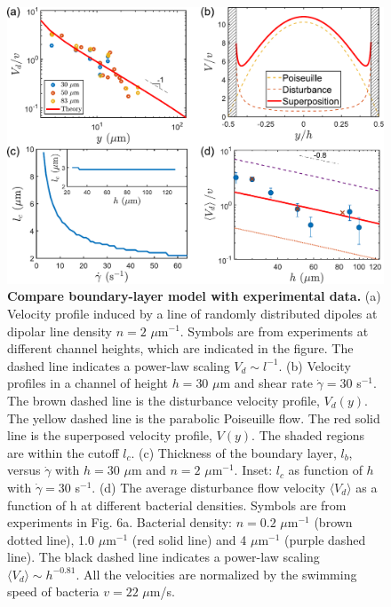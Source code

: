 \begin{figure}[!ht]
	\begin{center}
	\includegraphics[width=5.5 in]{Figs/3-Rheo/7b.pdf}
	\end{center}
	\caption[Compare Boundary-layer Model with Experimental Data]
	{
	\textbf{Compare boundary-layer model with experimental data.}
  (a) Velocity profile induced by a line of randomly distributed dipoles at dipolar line density $n = 2$ $\mu$m$^{-1}$. Symbols are from experiments at different channel heights, which are indicated in the figure. The dashed line indicates a power-law scaling $V_d \sim l^{-1}$.
  (b) Velocity profiles in a channel of height $h = 30$ $\mu$m and shear rate $\dot\gamma=30$ s$^{-1}$. The brown dashed line is the disturbance velocity profile, $V_d(y)$. The yellow dashed line is the parabolic Poiseuille flow. The red solid line is the superposed velocity profile, $V(y)$. The shaded regions are within the cutoff $l_c$.
  (c) Thickness of the boundary layer, $l_b$, versus $\dot\gamma$ with $h = 30$ $\mu$m and $n = 2$ $\mu$m$^{-1}$. Inset: $l_c$ as function of $h$ with $\dot\gamma = 30$ s$^{-1}$.
  (d) The average disturbance flow velocity $\langle V_d \rangle$ as a function of h at different bacterial densities. Symbols are from experiments in Fig. 6a. Bacterial density: $n = 0.2$ $\mu$m$^{-1}$ (brown dotted line), 1.0 $\mu$m$^{-1}$ (red solid line) and 4 $\mu$m$^{-1}$ (purple dashed line). The black dashed line indicates a power-law scaling $\langle V_d \rangle \sim h^{-0.81}$. All the velocities are normalized by the swimming speed of bacteria $v = 22$ $\mu$m/s.
  }
  \label{fig:3-model-compare}
\end{figure}



